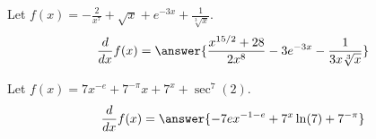 \documentclass{ximera}
\begin{document}
\begin{shuffle}

\begin{exercise}
Let $f(x)=-\frac{2}{x^7}+\sqrt{x}+e^{-3 x}+\frac{1}{\sqrt[3]{x}}$.
\[
\ddx f(x) = \answer{\frac{x^{15/2}+28}{2 x^8}-3 e^{-3 x}-\frac{1}{3 x \sqrt[3]{x}}}
\]
\end{exercise}


\begin{exercise}
Let $f(x)=7 x^{-e}+7^{-\pi } x+7^x+\sec ^7(2)$.
\[
\ddx f(x) = \answer{-7 e x^{-1-e}+7^x \ln (7)+7^{-\pi }}
\]
\end{exercise}

\end{shuffle}
\end{document}
